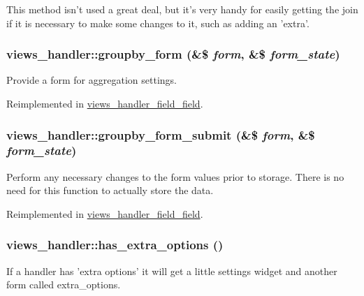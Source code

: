 This method isn't used a great deal, but it's very handy for easily getting the join if it is necessary to make some changes to it, such as adding an 'extra'. \hypertarget{classviews__handler_a22753b2a1aba15a7b0276fe8adb1dd8f}{
\subsubsection[{groupby\_\-form}]{\setlength{\rightskip}{0pt plus 5cm}views\_\-handler::groupby\_\-form (\&\$ {\em form}, \/  \&\$ {\em form\_\-state})}}
\label{classviews__handler_a22753b2a1aba15a7b0276fe8adb1dd8f}
Provide a form for aggregation settings. 

Reimplemented in \hyperlink{classviews__handler__field__field_a9bd5f09dbd4498880d106ff9d7d1b967}{views\_\-handler\_\-field\_\-field}.\hypertarget{classviews__handler_a73b3d91e7c3ac0ccbe3541c518acf41f}{
\subsubsection[{groupby\_\-form\_\-submit}]{\setlength{\rightskip}{0pt plus 5cm}views\_\-handler::groupby\_\-form\_\-submit (\&\$ {\em form}, \/  \&\$ {\em form\_\-state})}}
\label{classviews__handler_a73b3d91e7c3ac0ccbe3541c518acf41f}
Perform any necessary changes to the form values prior to storage. There is no need for this function to actually store the data. 

Reimplemented in \hyperlink{classviews__handler__field__field_a2ff4444b58879ac73fefcfcff43f3d0e}{views\_\-handler\_\-field\_\-field}.\hypertarget{classviews__handler_a10d35469346efc352d21e5f44de60b2e}{
\subsubsection[{has\_\-extra\_\-options}]{\setlength{\rightskip}{0pt plus 5cm}views\_\-handler::has\_\-extra\_\-options ()}}
\label{classviews__handler_a10d35469346efc352d21e5f44de60b2e}
If a handler has 'extra options' it will get a little settings widget and another form called extra\_\-options. 


